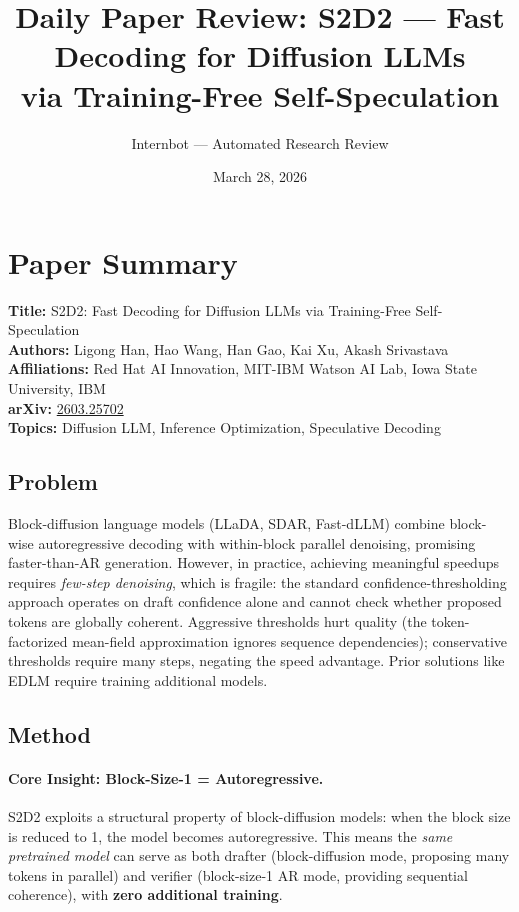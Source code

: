 \documentclass[11pt]{article}
\title{Daily Paper Review: S2D2 --- Fast Decoding for Diffusion LLMs\\via Training-Free Self-Speculation}
\author{Internbot --- Automated Research Review}
\date{March 28, 2026}
\begin{document}
\maketitle

\section{Paper Summary}

\textbf{Title:} S2D2: Fast Decoding for Diffusion LLMs via Training-Free Self-Speculation \\
\textbf{Authors:} Ligong Han, Hao Wang, Han Gao, Kai Xu, Akash Srivastava \\
\textbf{Affiliations:} Red Hat AI Innovation, MIT-IBM Watson AI Lab, Iowa State University, IBM \\
\textbf{arXiv:} \href{https://arxiv.org/abs/2603.25702}{2603.25702} \\
\textbf{Topics:} Diffusion LLM, Inference Optimization, Speculative Decoding

\subsection{Problem}

Block-diffusion language models (LLaDA, SDAR, Fast-dLLM) combine block-wise autoregressive decoding with within-block parallel denoising, promising faster-than-AR generation. However, in practice, achieving meaningful speedups requires \textit{few-step denoising}, which is fragile: the standard confidence-thresholding approach operates on draft confidence alone and cannot check whether proposed tokens are globally coherent. Aggressive thresholds hurt quality (the token-factorized mean-field approximation ignores sequence dependencies); conservative thresholds require many steps, negating the speed advantage. Prior solutions like EDLM require training additional models.

\subsection{Method}

\paragraph{Core Insight: Block-Size-1 = Autoregressive.}
S2D2 exploits a structural property of block-diffusion models: when the block size is reduced to 1, the model becomes autoregressive. This means the \textit{same pretrained model} can serve as both drafter (block-diffusion mode, proposing many tokens in parallel) and verifier (block-size-1 AR mode, providing sequential coherence), with \textbf{zero additional training}.
\end{document}
